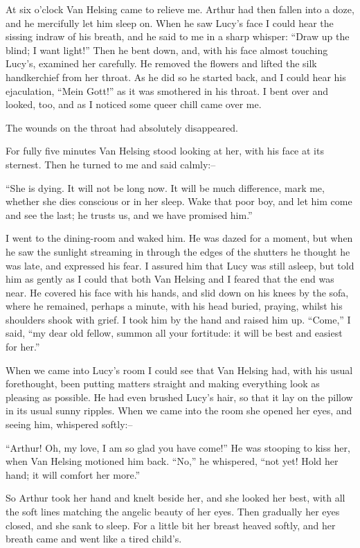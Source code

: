 \documentclass[12pt,openright]{book}
\begin{document}
At six o’clock Van Helsing came to relieve me. Arthur had then fallen into a doze, and he mercifully let him sleep on. When he saw Lucy’s face I could hear the sissing indraw of his breath, and he said to me in a sharp whisper: “Draw up the blind; I want light!” Then he bent down, and, with his face almost touching Lucy’s, examined her carefully. He removed the flowers and lifted the silk handkerchief from her throat. As he did so he started back, and I could hear his ejaculation, “Mein Gott!” as it was smothered in his throat. I bent over and looked, too, and as I noticed some queer chill came over me.

The wounds on the throat had absolutely disappeared.

For fully five minutes Van Helsing stood looking at her, with his face at its sternest. Then he turned to me and said calmly:–

“She is dying. It will not be long now. It will be much difference, mark me, whether she dies conscious or in her sleep. Wake that poor boy, and let him come and see the last; he trusts us, and we have promised him.”

I went to the dining-room and waked him. He was dazed for a moment, but when he saw the sunlight streaming in through the edges of the shutters he thought he was late, and expressed his fear. I assured him that Lucy was still asleep, but told him as gently as I could that both Van Helsing and I feared that the end was near. He covered his face with his hands, and slid down on his knees by the sofa, where he remained, perhaps a minute, with his head buried, praying, whilst his shoulders shook with grief. I took him by the hand and raised him up. “Come,” I said, “my dear old fellow, summon all your fortitude: it will be best and easiest for her.”

When we came into Lucy’s room I could see that Van Helsing had, with his usual forethought, been putting matters straight and making everything look as pleasing as possible. He had even brushed Lucy’s hair, so that it lay on the pillow in its usual sunny ripples. When we came into the room she opened her eyes, and seeing him, whispered softly:–

“Arthur! Oh, my love, I am so glad you have come!” He was stooping to kiss her, when Van Helsing motioned him back. “No,” he whispered, “not yet! Hold her hand; it will comfort her more.”

So Arthur took her hand and knelt beside her, and she looked her best, with all the soft lines matching the angelic beauty of her eyes. Then gradually her eyes closed, and she sank to sleep. For a little bit her breast heaved softly, and her breath came and went like a tired child’s.
\end{document}
